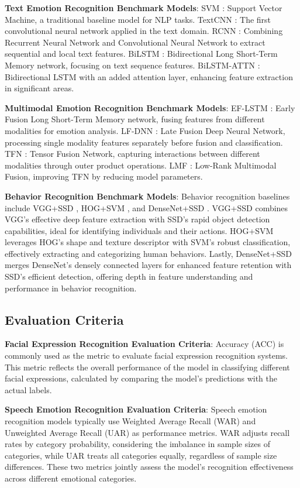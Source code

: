 \documentclass[preprint,12pt]{elsarticle}
\begin{document}
\textbf{Text Emotion Recognition Benchmark Models}: SVM \cite{ref64}: Support Vector Machine, a traditional baseline model for NLP tasks. TextCNN \cite{ref65}: The first convolutional neural network applied in the text domain. RCNN \cite{ref66}: Combining Recurrent Neural Network and Convolutional Neural Network to extract sequential and local text features. BiLSTM \cite{ref67}: Bidirectional Long Short-Term Memory network, focusing on text sequence features. BiLSTM-ATTN \cite{ref68}: Bidirectional LSTM with an added attention layer, enhancing feature extraction in significant areas.

\textbf{Multimodal Emotion Recognition Benchmark Models}: EF-LSTM \cite{ref69}: Early Fusion Long Short-Term Memory network, fusing features from different modalities for emotion analysis. LF-DNN \cite{ref70}: Late Fusion Deep Neural Network, processing single modality features separately before fusion and classification. TFN \cite{ref71}: Tensor Fusion Network, capturing interactions between different modalities through outer product operations. LMF \cite{ref72}: Low-Rank Multimodal Fusion, improving TFN by reducing model parameters.

\textbf{Behavior Recognition Benchmark Models}: Behavior recognition baselines include VGG+SSD \cite{ref73}, HOG+SVM \cite{ref74}, and DenseNet+SSD \cite{ref75}. VGG+SSD combines VGG's effective deep feature extraction with SSD's rapid object detection capabilities, ideal for identifying individuals and their actions. HOG+SVM leverages HOG's shape and texture descriptor with SVM's robust classification, effectively extracting and categorizing human behaviors. Lastly, DenseNet+SSD merges DenseNet's densely connected layers for enhanced feature retention with SSD's efficient detection, offering depth in feature understanding and performance in behavior recognition.
\subsection{Evaluation Criteria}

\textbf{Facial Expression Recognition Evaluation Criteria}: Accuracy (ACC) is commonly used as the metric to evaluate facial expression recognition systems. This metric reflects the overall performance of the model in classifying different facial expressions, calculated by comparing the model's predictions with the actual labels.

\textbf{Speech Emotion Recognition Evaluation Criteria}: Speech emotion recognition models typically use Weighted Average Recall (WAR) and Unweighted Average Recall (UAR) as performance metrics. WAR adjusts recall rates by category probability, considering the imbalance in sample sizes of categories, while UAR treats all categories equally, regardless of sample size differences. These two metrics jointly assess the model's recognition effectiveness across different emotional categories.
\end{document}
